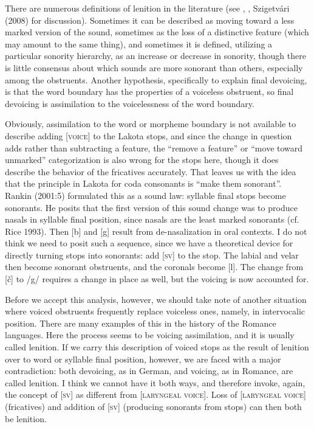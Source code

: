 \documentclass[output=paper]{LSP/langsci}
\begin{document}
There are numerous definitions of lenition in the literature (see \citet{Honeybone2008}, \citet{Harris2009}, Szigetv\'ari (2008) for discussion). Sometimes it can be described as moving toward a less marked version of the sound, sometimes as the loss of a distinctive feature (which may amount to the same thing), and sometimes it is defined, utilizing a particular sonority hierarchy, as an increase or decrease in sonority, though there is little consensus about which sounds are more sonorant than others, especially among the obstruents. Another hypothesis, specifically to explain final devoicing, is that the word boundary has the properties of a voiceless obstruent, so final devoicing is assimilation to the voicelessness of the word boundary.

Obviously, assimilation to the word or morpheme boundary is not available to describe adding [\textsc{voice}] to the Lakota stops, and since the change in question adds rather than subtracting a feature, the ``remove a feature'' or ``move toward unmarked'' categorization is also wrong for the stops here, though it does describe the behavior of the fricatives accurately. That leaves us with the idea that the principle in Lakota for coda consonants is ``make them sonorant''. Rankin (2001:5) formulated this as a sound law: syllable final stops become sonorants. He posits that the first version of this sound change was to produce nasals in syllable final position, since nasals are the least marked sonorants (cf. Rice 1993). Then [b] and [g] result from de-nasalization in oral contexts. I do not think we need to posit such a sequence, since we have a theoretical device for directly turning stops into sonorants: add [\textsc{sv}] to the stop. The labial and velar then become sonorant obstruents, and the coronals become [l]. The change from [\v{c}] to /g/ requires a change in place as well, but the voicing is now accounted for.

Before we accept this analysis, however, we should take note of another situation where voiced obstruents frequently replace voiceless ones, namely, in intervocalic position. There are many examples of this in the history of the Romance languages. Here the process seems to be voicing assimilation, and it is usually called lenition. If we carry this description of voiced stops as the result of lenition over to word or syllable final position, however, we are faced with a major contradiction: both devoicing, as in German, and voicing, as in Romance, are called lenition. I think we cannot have it both ways, and therefore invoke, again, the concept of [\textsc{sv}] as different from [\textsc{laryngeal voice}]. Loss of [\textsc{laryngeal voice}] (fricatives) and addition of [\textsc{sv}] (producing sonorants from stops) can then both be lenition.
\end{document}
